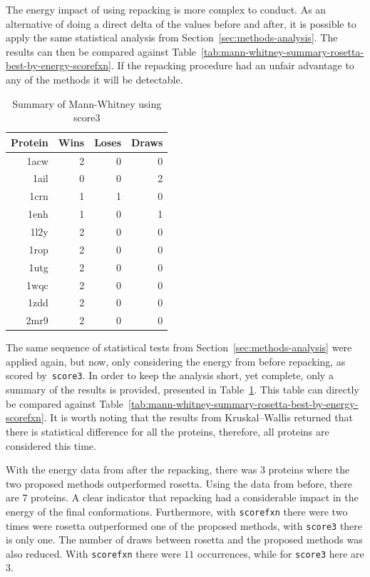 The energy impact of using repacking is more complex to conduct. As an
alternative of doing a direct delta of the values before and after, it is
possible to apply the same statistical analysis from
Section~\ref{sec:methods-analysis}. The results can then be compared
against Table~\ref{tab:mann-whitney-summary-rosetta-best-by-energy-scorefxn}.
If the repacking procedure had an unfair advantage to any of the methods
it will be detectable.

\begin{table}
  \centering
  \begin{tabular}{r|r|r|r}
  Protein & Wins & Loses & Draws \\ \hline \hline
   1acw &  2 &  0 &  0 \\ \hline
   1ail &  0 &  0 &  2 \\ \hline
   1crn &  1 &  1 &  0 \\ \hline
   1enh &  1 &  0 &  1 \\ \hline
   1l2y &  2 &  0 &  0 \\ \hline
   1rop &  2 &  0 &  0 \\ \hline
   1utg &  2 &  0 &  0 \\ \hline
   1wqc &  2 &  0 &  0 \\ \hline
   1zdd &  2 &  0 &  0 \\ \hline
   2mr9 &  2 &  0 &  0 \\ \hline
  \end{tabular}
  \caption{Summary of Mann-Whitney using score3}
  \label{tab:mann-whitney-summary-best-by-energy-score3}
\end{table}

The same sequence of statistical tests from
Section~\ref{sec:methods-analysis} were applied again, but now, only
considering the energy from before repacking, as scored by~\texttt{score3}.
In order to keep the analysis short, yet complete, only a summary of the
results is provided, presented in
Table~\ref{tab:mann-whitney-summary-best-by-energy-score3}. This table can
directly be compared against
Table~\ref{tab:mann-whitney-summary-rosetta-best-by-energy-scorefxn}.
It is worth noting that the results from Kruskal–Wallis returned that there is
statistical difference for all the proteins, therefore, all proteins are
considered this time.

With the energy data from after the repacking, there was $3$ proteins where the
two proposed methods outperformed rosetta. Using the data from before, there are
$7$ proteins. A clear indicator that repacking had a considerable impact in the
energy of the final conformations. Furthermore, with \texttt{scorefxn} there
were two times were rosetta outperformed one of the proposed methods, with
\texttt{score3} there is only one. The number of draws between rosetta and the
proposed methods was also reduced. With \texttt{scorefxn} there were $11$
occurrences, while for \texttt{score3} here are $3$.


